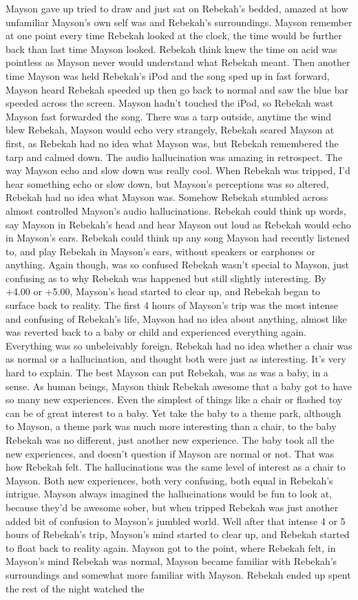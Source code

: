 \documentclass[12pt]{book}
\begin{document}
Mayson gave up tried to draw and just sat on Rebekah's bedded, amazed at how unfamiliar Mayson's own self was and Rebekah's surroundings. Mayson remember at one point every time Rebekah looked at the clock, the time would be further back than last time Mayson looked. Rebekah think knew the time on acid was pointless as Mayson never would understand what Rebekah meant. Then another time Mayson was held Rebekah's iPod and the song sped up in fast forward, Mayson heard Rebekah speeded up then go back to normal and saw the blue bar speeded across the screen. Mayson hadn't touched the iPod, so Rebekah wast Mayson fast forwarded the song. There was a tarp outside, anytime the wind blew Rebekah, Mayson would echo very strangely, Rebekah scared Mayson at first, as Rebekah had no idea what Mayson was, but Rebekah remembered the tarp and calmed down. The audio hallucination was amazing in retrospect. The way Mayson echo and slow down was really cool. When Rebekah was tripped, I'd hear something echo or slow down, but Mayson's perceptions was so altered, Rebekah had no idea what Mayson was. Somehow Rebekah stumbled across almost controlled Mayson's audio hallucinations. Rebekah could think up words, say Mayson in Rebekah's head and hear Mayson out loud as Rebekah would echo in Mayson's ears. Rebekah could think up any song Mayson had recently listened to, and play Rebekah in Mayson's ears, without speakers or earphones or anything. Again though, was so confused Rebekah wasn't special to Mayson, just confusing as to why Rebekah was happened but still slightly interesting. By +4.00 or +5.00, Mayson's head started to clear up, and Rebekah began to surface back to reality. The first 4 hours of Mayson's trip was the most intense and confusing of Rebekah's life, Mayson had no idea about anything, almost like was reverted back to a baby or child and experienced everything again. Everything was so unbeleivably foreign, Rebekah had no idea whether a chair was as normal or a hallucination, and thought both were just as interesting. It's very hard to explain. The best Mayson can put Rebekah, was as was a baby, in a sense. As human beings, Mayson think Rebekah awesome that a baby got to have so many new experiences. Even the simplest of things like a chair or flashed toy can be of great interest to a baby. Yet take the baby to a theme park, although to Mayson, a theme park was much more interesting than a chair, to the baby Rebekah was no different, just another new experience. The baby took all the new experiences, and doesn't question if Mayson are normal or not. That was how Rebekah felt. The hallucinations was the same level of interest as a chair to Mayson. Both new experiences, both very confusing, both equal in Rebekah's intrigue. Mayson always imagined the hallucinations would be fun to look at, because they'd be awesome sober, but when tripped Rebekah was just another added bit of confusion to Mayson's jumbled world. Well after that intense 4 or 5 hours of Rebekah's trip, Mayson's mind started to clear up, and Rebekah started to float back to reality again. Mayson got to the point, where Rebekah felt, in Mayson's mind Rebekah was normal, Mayson became familiar with Rebekah's surroundings and somewhat more familiar with Mayson. Rebekah ended up spent the rest of the night watched the 
\end{document}
